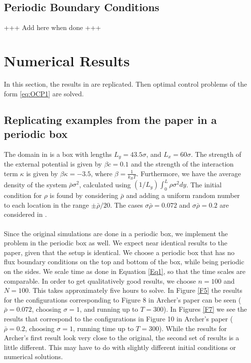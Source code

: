 \documentclass[11pt, a4paper]{article}
\theoremstyle{definition}
\begin{document}
\subsection{Periodic Boundary Conditions}
+++ Add here when done +++
\section{Numerical Results}
In this section, the results in \cite{ArcherSed1} are replicated. Then optimal control problems of the form \eqref{eq:OCP1} are solved.



\subsection{Replicating examples from the paper in a periodic box}
The domain in \cite{ArcherSed1} is a box with lengths $L_y = 43.5 \sigma$, and $L_x = 60 \sigma$. 
The strength of the external potential is given by $\beta c = 0.1$ and the strength of the interaction term $\kappa$ is given by $\beta \kappa = - 3.5$, where $\beta = \frac{1}{k_BT}$. 
Furthermore, we have the average density of the system $\bar \rho \sigma^2$, calculated using $(1/L_y)\int_0^L \rho \sigma^2 dy$.
The initial condition for $\rho$ is found by considering $\bar \rho$ and adding a uniform random number to each location in the range $\pm \bar \rho/ 20$. The cases $\sigma \bar \rho = 0.072$ and $\sigma \bar \rho = 0.2$ are considered in \cite{ArcherSed1}.
\\
\\
Since the original simulations are done in a periodic box, we implement the problem in the periodic box as well. We expect near identical results to the paper, given that the setup is identical.
We choose a periodic box that has no flux boundary conditions on the top and bottom of the box, while being periodic on the sides. 
We scale time as done in Equation \eqref{Eq1}, so that the time scales are comparable. In order to get qualitatively good results, we choose $n =100$ and $N = 100$. This takes approximately five hours to solve. In Figure \ref{F5} the results for the configurations corresponding to Figure 8 in Archer's paper can be seen ($ \bar \rho = 0.072$, choosing $\sigma = 1$, and running up to $T = 300$). In Figures \ref{F7} we see the results that correspond to the configurations in Figure 10 in Archer's paper ($ \bar \rho = 0.2$, choosing $\sigma = 1$, running time up to $T = 300$). While the results for Archer's first result look very close to the original, the second set of results is a little different. This may have to do with slightly different initial conditions or numerical solutions.
\end{document}
